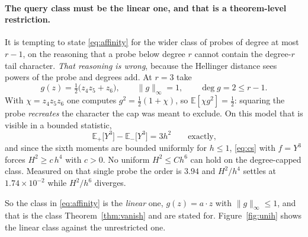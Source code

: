 \paragraph{The query class must be the linear one, and that is a theorem-level
restriction.}
It is tempting to state \eqref{eq:affinity} for the wider class of probes of degree at
most $r-1$, on the reasoning that a probe below degree $r$ cannot contain the degree-$r$
tail character. \emph{That reasoning is wrong}, because the Hellinger distance sees powers
of the probe and degrees add. At $r=3$ take
\[
g(z)=\tfrac{1}{2}\bigl(z_{4}z_{5}+z_{6}\bigr),
\qquad \|g\|_{\infty}=1,\qquad \deg g=2\le r-1 .
\]
With $\chi=z_{4}z_{5}z_{6}$ one computes $g^{2}=\tfrac{1}{2}(1+\chi)$, so
$\mathbb{E}[\chi g^{2}]=\tfrac12$: squaring the probe \emph{recreates} the character the
cap was meant to exclude. On this model that is visible in a bounded statistic,
\[
\mathbb{E}_{+}\bigl[Y^{3}\bigr]-\mathbb{E}_{-}\bigl[Y^{3}\bigr]=3h^{2}
\qquad\text{exactly,}
\]
and since the sixth moments are bounded uniformly for $h\le1$, \eqref{eq:cs} with $f=Y^{3}$
forces $H^{2}\ge c\,h^{4}$ with $c>0$. No uniform $H^{2}\le Ch^{6}$ can hold on the
degree-capped class. Measured on that single probe the order is $3.94$ and
$H^{2}/h^{4}$ settles at $1.74\times10^{-2}$ while $H^{2}/h^{6}$ diverges. \NUM{}

So the class in \eqref{eq:affinity} is the \emph{linear} one, $g(z)=a\cdot z$ with
$\|g\|_{\infty}\le1$, and that is the class Theorem~\ref{thm:vanish} and
 are stated for. Figure~\ref{fig:unih} shows the linear
class against the unrestricted one.


